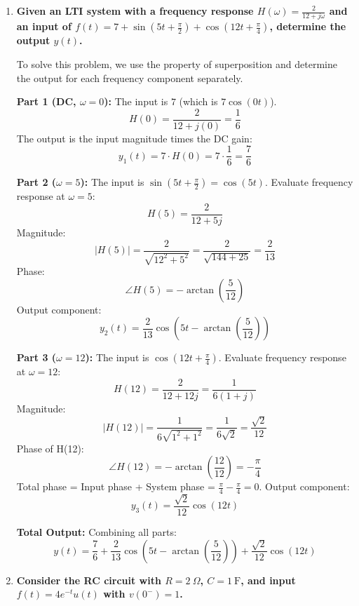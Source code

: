 \documentclass[12pt,letterpaper, onecolumn]{exam}
\begin{document}
\begin{enumerate}
        Thus, the signal is represented by the superposition of these two distinct phasors.

    \item \textbf{Given an LTI system with a frequency response $H(\omega) = \frac{2}{12 + j\omega}$ and an input of $f(t) = 7 + \sin{(5t + \frac{\pi}{2})} + \cos{(12t + \frac{\pi}{4})}$, determine the output $y(t)$.}

        To solve this problem, we use the property of superposition and determine the output for each frequency component separately.

        \textbf{Part 1 (DC, $\omega=0$):}
        The input is $7$ (which is $7\cos(0t)$).
        \[
             H(0) = \frac{2}{12 + j(0)} = \frac{1}{6}
        \]
        The output is the input magnitude times the DC gain:
        \[
             y_1(t) = 7 \cdot H(0) = 7 \cdot \frac{1}{6} = \frac{7}{6}
        \]

        \textbf{Part 2 ($\omega=5$):}
        The input is $\sin{(5t + \frac{\pi}{2})} = \cos(5t)$.
        Evaluate frequency response at $\omega=5$:
        \[
            H(5)= \frac{2}{12 + 5j}
        \]
        Magnitude:
        \[
            |H(5)| = \frac{2}{\sqrt{12^2 + 5^2}} = \frac{2}{\sqrt{144+25}} = \frac{2}{13}
        \]
        Phase:
        \[
            \angle H(5) = -\arctan{\left(\frac{5}{12}\right)}
        \]
        Output component:
        \[
            y_2(t) = \frac{2}{13}\cos\left(5t - \arctan{\left(\frac{5}{12}\right)}\right)
        \]

        \textbf{Part 3 ($\omega=12$):}
        The input is $\cos{(12t + \frac{\pi}{4})}$.
        Evaluate frequency response at $\omega=12$:
        \[
            H(12) = \frac{2}{12 + 12j} = \frac{1}{6(1+j)}
        \]
        Magnitude:
        \[
             |H(12)| = \frac{1}{6\sqrt{1^2+1^2}} = \frac{1}{6\sqrt{2}} = \frac{\sqrt{2}}{12}
        \]
        Phase of H(12):
        \[
            \angle H(12) = -\arctan{\left(\frac{12}{12}\right)} = -\frac{\pi}{4}
        \]
        Total phase = Input phase + System phase = $\frac{\pi}{4} - \frac{\pi}{4} = 0$.
        Output component:
        \[
            y_3(t) = \frac{\sqrt{2}}{12}\cos(12t)
        \]

        \textbf{Total Output:}
        Combining all parts:
        \[
            y(t) = \frac{7}{6} + \frac{2}{13}\cos{\left(5t - \arctan{\left(\frac{5}{12}\right)}\right)} + \frac{\sqrt{2}}{12}\cos(12t)
        \]

    \item \textbf{Consider the RC circuit with $R = 2\ \Omega$, $C = 1\ \mathrm{F}$, and input $f(t)=4e^{-t}u(t)$ with $v(0^-)=1$.}


\end{enumerate}
\end{document}
